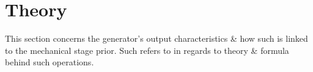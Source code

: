 \documentclass[conference]{IEEEtran}
\begin{document}



\section{Theory}
This section concerns the generator's output characteristics \& how such is linked to the mechanical stage prior. Such refers to \cite{industrial2} in regards to theory \& formula behind such operations.

\end{document}
